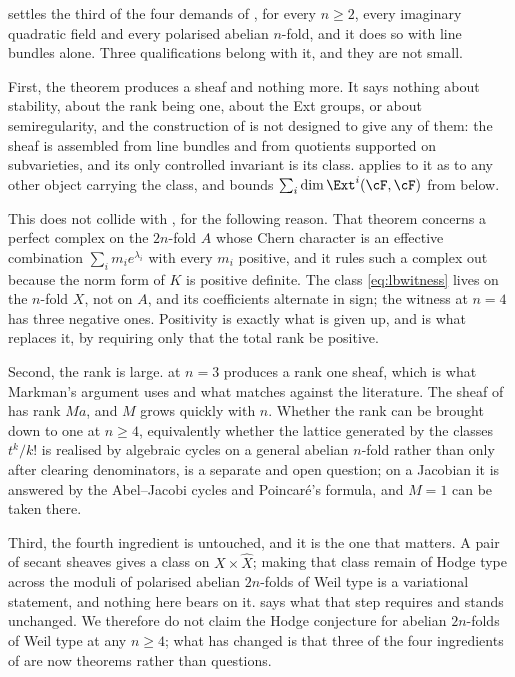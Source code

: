 \begin{remark}\label{rem:thirdclosed}
 settles the third of the four demands of
, for every $n\ge2$, every imaginary quadratic field and every
polarised abelian $n$-fold, and it does so with line bundles alone. Three
qualifications belong with it, and they are not small.

First, the theorem produces a sheaf and nothing more. It says nothing about
stability, about the rank being one, about the Ext groups, or about
semiregularity, and the construction of  is not designed to
give any of them: the sheaf is assembled from line bundles and from quotients
supported on subvarieties, and its only controlled invariant is its class.
 applies to it as to any other object carrying the class,
and bounds $\sum_{i}\dim\Ext^{i}(\cF,\cF)$ from below.

This does not collide with , for the following reason. That
theorem concerns a perfect complex on the $2n$-fold $A$ whose Chern character
is an effective combination $\sum_{i}m_{i}e^{\lambda_{i}}$ with every $m_{i}$
positive, and it rules such a complex out because the norm form of $K$ is
positive definite. The class \eqref{eq:lbwitness} lives on the $n$-fold $X$,
not on $A$, and its coefficients alternate in sign; the witness at $n=4$ has
three negative ones. Positivity is exactly what is given up, and
 is what replaces it, by requiring only that the total rank
be positive.

Second, the rank is large.  at $n=3$ produces a rank one
sheaf, which is what Markman's argument uses and what 
matches against the literature. The sheaf of  has rank
$Ma$, and $M$ grows quickly with $n$. Whether the rank can be brought down to
one at $n\ge4$, equivalently whether the lattice generated by the classes
$t^{k}/k!$ is realised by algebraic cycles on a general abelian $n$-fold rather
than only after clearing denominators, is a separate and open
question; on a Jacobian it is answered by the Abel--Jacobi cycles and
Poincar\'e's formula, and $M=1$ can be taken there.

Third, the fourth ingredient is untouched, and it is the one that matters. A
pair of secant sheaves gives a class on $X\times\widehat{X}$; making that class
remain of Hodge type across the moduli of polarised abelian $2n$-folds of Weil
type is a variational statement, and nothing here bears on it.
 says what that step requires and stands unchanged.
We therefore do not claim the Hodge conjecture for abelian $2n$-folds of Weil
type at any $n\ge4$; what has changed is that three of the four ingredients of
 are now theorems rather than questions.
\end{remark}

